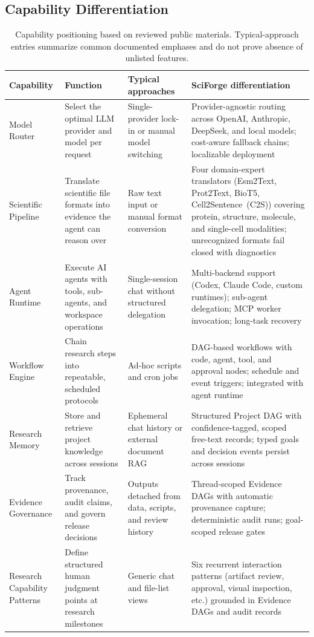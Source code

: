\documentclass[sn-basic,Numbered,pdflatex]{sn-jnl}
\begin{document}
\clearpage
\begin{appendices}
\renewcommand{\theHtable}{A.\arabic{table}}

\section{Capability Differentiation}

\begin{table}[ht!]
\caption{Capability positioning based on reviewed public materials. Typical-approach entries summarize common documented emphases and do not prove absence of unlisted features.}
\label{tab:capability_differentiation}
\scriptsize
\centering
\setlength{\tabcolsep}{2.5pt}
\renewcommand{\arraystretch}{1.08}
\begin{tabular}{@{}L{2.0cm} L{2.4cm} L{2.8cm} L{3.1cm}@{}}
\toprule
\textbf{Capability} & \textbf{Function} & \textbf{Typical approaches} & \textbf{SciForge differentiation} \\
\midrule
Model Router
& Select the optimal LLM provider and model per request
& Single-provider lock-in or manual model switching
& Provider-agnostic routing across OpenAI, Anthropic, DeepSeek, and local models; cost-aware fallback chains; localizable deployment \\
Scientific Pipeline
& Translate scientific file formats into evidence the agent can reason over
& Raw text input or manual format conversion
& Four domain-expert translators (Esm2Text, Prot2Text, BioT5, Cell2Sentence~(C2S)) covering protein, structure, molecule, and single-cell modalities; unrecognized formats fail closed with diagnostics \\
Agent Runtime
& Execute AI agents with tools, sub-agents, and workspace operations
& Single-session chat without structured delegation
& Multi-backend support (Codex, Claude Code, custom runtimes); sub-agent delegation; MCP worker invocation; long-task recovery \\
Workflow Engine
& Chain research steps into repeatable, scheduled protocols
& Ad-hoc scripts and cron jobs
& DAG-based workflows with code, agent, tool, and approval nodes; schedule and event triggers; integrated with agent runtime \\
Research Memory
& Store and retrieve project knowledge across sessions
& Ephemeral chat history or external document RAG
& Structured Project DAG with confidence-tagged, scoped free-text records; typed goals and decision events persist across sessions \\
Evidence Governance
& Track provenance, audit claims, and govern release decisions
& Outputs detached from data, scripts, and review history
& Thread-scoped Evidence DAGs with automatic provenance capture; deterministic audit runs; goal-scoped release gates \\
Research Capability Patterns
& Define structured human judgment points at research milestones
& Generic chat and file-list views
& Six recurrent interaction patterns (artifact review, approval, visual inspection, etc.) grounded in Evidence DAGs and audit records \\
\bottomrule
\end{tabular}
\end{table}
\clearpage


\end{appendices}
\end{document}
